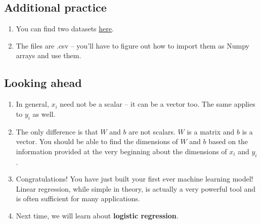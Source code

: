 \documentclass{article}
\begin{document}
        \subsection{Additional practice}
            \begin{enumerate}
                \item You can find two datasets \href{https://github.com/aniruddhkb/enigmatutorials/tree/master/intro2ml/linearRegression}{here}.
                \item The files are .csv -- you'll have to figure out how to import them as Numpy arrays and use them.
            \end{enumerate}
        \subsection{Looking ahead}
            \begin{enumerate}
                \item In general, $x_i$ need not be a scalar -- it can be a vector too. The same applies to $y_i$ as well.
                \item The only difference is that $W$ and $b$ are not scalars. $W$ is a matrix and $b$ is a vector. You should be able to
                find the dimensions of $W$ and $b$ based on the information provided at the very beginning about the dimensions of $x_i$ and $y_i$.
                \item Congratulations! You have just built your first ever machine learning model! Linear regression, while simple in theory, is actually a 
                very powerful tool and is often sufficient for many applications.
                \item Next time, we will learn about \textbf{logistic regression}.
            \end{enumerate}
            
            
\end{document}
